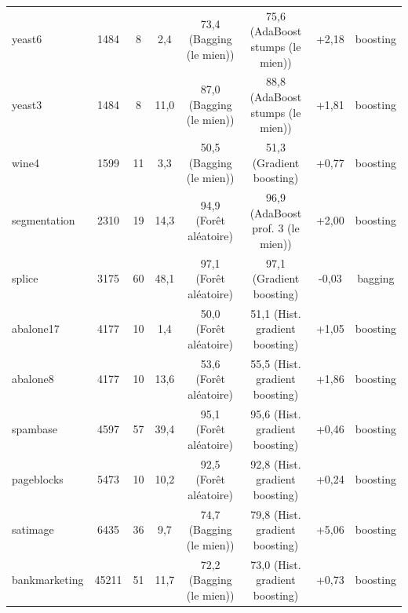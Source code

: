 \begin{table}[tbp]
{\begin{tabular}{lccccccc}
yeast6 & 1484 & 8 & 2,4 & 73,4 (Bagging (le mien)) & 75,6 (AdaBoost stumps (le mien)) & +2,18 & boosting \\
yeast3 & 1484 & 8 & 11,0 & 87,0 (Bagging (le mien)) & 88,8 (AdaBoost stumps (le mien)) & +1,81 & boosting \\
wine4 & 1599 & 11 & 3,3 & 50,5 (Bagging (le mien)) & 51,3 (Gradient boosting) & +0,77 & boosting \\
segmentation & 2310 & 19 & 14,3 & 94,9 (Forêt aléatoire) & 96,9 (AdaBoost prof. 3 (le mien)) & +2,00 & boosting \\
splice & 3175 & 60 & 48,1 & 97,1 (Forêt aléatoire) & 97,1 (Gradient boosting) & -0,03 & bagging \\
abalone17 & 4177 & 10 & 1,4 & 50,0 (Forêt aléatoire) & 51,1 (Hist. gradient boosting) & +1,05 & boosting \\
abalone8 & 4177 & 10 & 13,6 & 53,6 (Forêt aléatoire) & 55,5 (Hist. gradient boosting) & +1,86 & boosting \\
spambase & 4597 & 57 & 39,4 & 95,1 (Forêt aléatoire) & 95,6 (Hist. gradient boosting) & +0,46 & boosting \\
pageblocks & 5473 & 10 & 10,2 & 92,5 (Forêt aléatoire) & 92,8 (Hist. gradient boosting) & +0,24 & boosting \\
satimage & 6435 & 36 & 9,7 & 74,7 (Bagging (le mien)) & 79,8 (Hist. gradient boosting) & +5,06 & boosting \\
bankmarketing & 45211 & 51 & 11,7 & 72,2 (Bagging (le mien)) & 73,0 (Hist. gradient boosting) & +0,73 & boosting \\
\bottomrule
\end{tabular}
}
\end{table}
